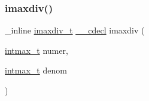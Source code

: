 \subsubsection{\texorpdfstring{imaxdiv()}{imaxdiv()}}
{\footnotesize\ttfamily \+\_\+inline \hyperlink{a00702}{imaxdiv\+\_\+t} \hyperlink{a00843_a238347d7669f8f1e9c83bfe63a2730c4}{\+\_\+\+\_\+cdecl} imaxdiv (\begin{DoxyParamCaption}\item[{\hyperlink{a00119_a036cd61bb4b30bb510b9538af4cebd1d}{intmax\+\_\+t}}]{numer,  }\item[{\hyperlink{a00119_a036cd61bb4b30bb510b9538af4cebd1d}{intmax\+\_\+t}}]{denom }\end{DoxyParamCaption})}

